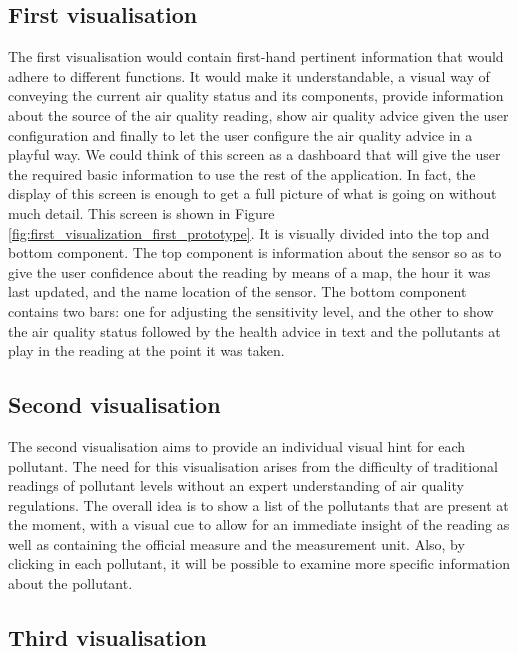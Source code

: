 \subsection{First visualisation}

The first visualisation would contain first-hand pertinent information that would adhere to different functions. It would make it understandable, a visual way of conveying the current air quality status and its components, provide information about the source of the air quality reading, show air quality advice given the user configuration and finally to let the user configure the air quality advice in a playful way. We could think of this screen as a dashboard that will give the user the required basic information to use the rest of the application. In fact, the display of this screen is enough to get a full picture of what is going on without much detail.
This screen is shown in Figure \ref{fig:first_visualization_first_prototype}. It is visually divided into the top and bottom component. The top component is information about the sensor so as to give the user confidence about the reading by means of a map, the hour it was last updated, and the name location of the sensor. The bottom component contains two bars: one for adjusting the sensitivity level, and the other to show the air quality status followed by the health advice in text and the pollutants at play in the reading at the point it was taken. 

\subsection{Second visualisation}

The second visualisation aims to provide an individual visual hint for each pollutant. The need for this visualisation arises from the difficulty of traditional readings of pollutant levels without an expert understanding of air quality regulations. The overall idea is to show a list of the pollutants that are present at the moment, with a visual cue to allow for an immediate insight of the reading as well as containing the official measure and the measurement unit. Also, by clicking in each pollutant, it will be possible to examine more specific information about the pollutant.

\subsection{Third visualisation}

